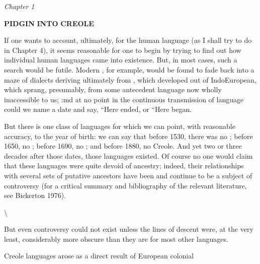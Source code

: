 \textit{Chapter} \textit{1}

\textbf{PIDGIN} \textbf{INTO} \textbf{CREOLE}

If one wants to account, ultimately, for the  human language (as I shall try to do in Chapter 4), it seems reasonable for one to begin by trying to find out how individual human languages came into existence. But, in most cases, such a search would be futile. Mod\-ern , for example, would be found to fade back into a maze of dialects deriving ultimately from , which developed out of Indo\-European, which sprang, presumably, from some antecedent language now wholly inaccessible to us; :md at no point in the continuous transmission of language could we name a date and say, ``Here  ended, or ``Here  began.{\textquotedbl}

But there is one class of languages for which we can point, with reasonable accuracy, to the year of birth: we can say that before 1530, there was no ; before 1650, no ; before 1690, no ; and before 1880, no  Creole. And yet two or three decades after those dates, those languages existed. Of course no one would claim that these languages were quite devoid of ancestry; indeed, their relationships with several sets of putative ancestors have been and continue to be a subject of controversy (for a critical sum\-mary and bibliography of the relevant literature, see Bickerton 1976).

{\textbackslash}


But even controversy could not exist unless the lines of descent were, at the very least, considerably more obscure than they are for most other languages.

Creole languages arose as a direct result of European colonial

